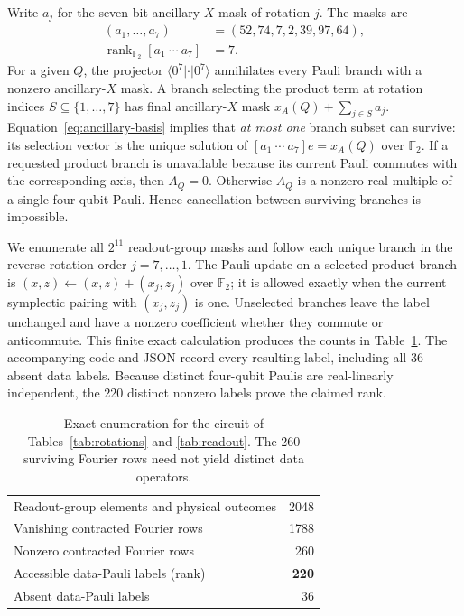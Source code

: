 \documentclass[aps,pra,reprint,floatfix,superscriptaddress,nofootinbib]{revtex4-2}
\newcommand{\Ftwo}{\mathbb F_2}
\newcommand{\rank}{\operatorname{rank}}
\begin{document}
Write $a_j$ for the seven-bit ancillary-$X$ mask of rotation $j$. The masks are
\begin{equation}
\begin{aligned}
 (a_1,\ldots,a_7)&=(52,74,7,2,39,97,64),\\
 \rank_{\Ftwo}[a_1\ \cdots\ a_7]&=7.
\end{aligned}
 \label{eq:ancillary-basis}
\end{equation}
For a given $Q$, the projector $\langle0^7|\cdot|0^7\rangle$ annihilates every Pauli branch with a nonzero ancillary-$X$ mask. A branch selecting the product term at rotation indices $S\subseteq\{1,\ldots,7\}$ has final ancillary-$X$ mask $x_A(Q)+\sum_{j\in S}a_j$. Equation~\eqref{eq:ancillary-basis} implies that \emph{at most one} branch subset can survive: its selection vector is the unique solution of $[a_1\ \cdots\ a_7]e=x_A(Q)$ over $\Ftwo$. If a requested product branch is unavailable because its current Pauli commutes with the corresponding axis, then $A_Q=0$. Otherwise $A_Q$ is a nonzero real multiple of a single four-qubit Pauli. Hence cancellation between surviving branches is impossible.

We enumerate all $2^{11}$ readout-group masks and follow each unique branch in the reverse rotation order $j=7,\ldots,1$. The Pauli update on a selected product branch is $(x,z)\leftarrow(x,z)+(x_j,z_j)$ over $\Ftwo$; it is allowed exactly when the current symplectic pairing with $(x_j,z_j)$ is one. Unselected branches leave the label unchanged and have a nonzero coefficient whether they commute or anticommute. This finite exact calculation produces the counts in Table~\ref{tab:counts}. The accompanying code and JSON record every resulting label, including all 36 absent data labels. Because distinct four-qubit Paulis are real-linearly independent, the 220 distinct nonzero labels prove the claimed rank.

\begin{table}[t]
\caption{Exact enumeration for the circuit of Tables~\ref{tab:rotations} and \ref{tab:readout}. The 260 surviving Fourier rows need not yield distinct data operators.}
\label{tab:counts}
\begin{ruledtabular}
\begin{tabular}{l r}
Readout-group elements and physical outcomes&2048\\
Vanishing contracted Fourier rows&1788\\
Nonzero contracted Fourier rows&260\\
Accessible data-Pauli labels (rank)&\textbf{220}\\
Absent data-Pauli labels&36\\
\end{tabular}
\end{ruledtabular}
\end{table}
\end{document}
